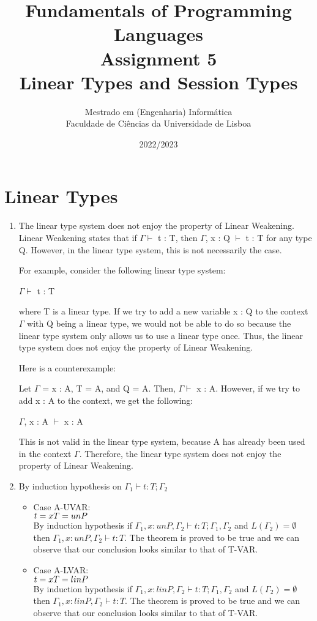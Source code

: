 \documentclass[a4paper]{article}
\title{
  \color{blue}Fundamentals of Programming Languages\\[1ex]
  Assignment 5\\[1ex]
  Linear Types and Session Types}
\author{Mestrado em (Engenharia) Informática\\
  Faculdade de Ciências da Universidade de Lisboa
}
\date{2022/2023}
\begin{document}
\maketitle
\setlength{\parskip}{1ex}
\thispagestyle{empty}

\section{Linear Types}
\begin{enumerate}
  \item The linear type system does not enjoy the property of Linear Weakening. Linear Weakening states that if $\Gamma \vdash$ t : T, then $\Gamma$, x : Q $\vdash$ t : T for any type Q. However, in the linear type system, this is not necessarily the case.

  For example, consider the following linear type system:
  
  $\Gamma \vdash$ t : T
  
  where T is a linear type. If we try to add a new variable x : Q to the context $\Gamma$ with Q being a linear type, we would not be able to do so because the linear type system only allows us to use a linear type once. Thus, the linear type system does not enjoy the property of Linear Weakening.
  
  Here is a counterexample:
  
  Let $\Gamma$ = {x : A}, T = A, and Q = A. Then, $\Gamma \vdash$ x : A. However, if we try to add x : A to the context, we get the following:
  
  $\Gamma$, x : A $\vdash$ x : A
  
  This is not valid in the linear type system, because A has already been used in the context $\Gamma$. Therefore, the linear type system does not enjoy the property of Linear Weakening.
  \item By induction hypothesis on $\Gamma_1 \vdash t : T;\Gamma_2$
  \begin{itemize}
    \item Case A-UVAR: 
    \\$t = x
    \\T = unP$
    \\By induction hypothesis if $\Gamma_1, x:unP, \Gamma_2 \vdash t:T;\Gamma_1,\Gamma_2$ and $L(\Gamma_2) = \emptyset$ then $\Gamma_1, x:unP, \Gamma_2 \vdash t:T$. The theorem is proved to be true and we can observe that our conclusion looks similar to that of T-VAR.

    \item Case A-LVAR:
    \\$t = x
    \\T = linP$
    \\By induction hypothesis if $\Gamma_1, x:linP, \Gamma_2 \vdash t:T;\Gamma_1,\Gamma_2$ and $L(\Gamma_2) = \emptyset$ then $\Gamma_1, x:linP, \Gamma_2 \vdash t:T$. The theorem is proved to be true and we can observe that our conclusion looks similar to that of T-VAR.


\end{itemize}
\end{enumerate}
\end{document}
